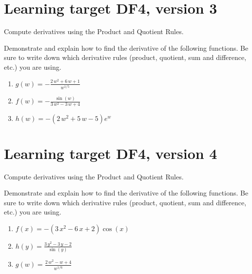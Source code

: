 \pagebreak

\section{Learning target DF4, version 3}

Compute derivatives using the Product and Quotient Rules.

\hrulefill

Demonstrate and explain how to find the derivative of the following functions. Be sure to write down which derivative rules (product, quotient, sum and difference, etc.) you are using.

\begin{enumerate}
    \item \(\renewcommand{\log}{\ln} g(w)= -\frac{2 \, w^{2} + 6 \, w + 1}{w^{1/5}}\)
    \vfill
    \item \(\renewcommand{\log}{\ln} f(w)= -\frac{\sin\left(w\right)}{3 \, w^{2} - 3 \, w + 4}\)
    \vfill
    \item \(\renewcommand{\log}{\ln} h(w)= -{\left(2 \, w^{2} + 5 \, w - 5\right)} e^{w}\)
    \vfill
\end{enumerate}

\pagebreak

\section{Learning target DF4, version 4}

Compute derivatives using the Product and Quotient Rules.

\hrulefill

Demonstrate and explain how to find the derivative of the following functions. Be sure to write down which derivative rules (product, quotient, sum and difference, etc.) you are using.

\begin{enumerate}
    \item \(\renewcommand{\log}{\ln} f(x)= -{\left(3 \, x^{2} - 6 \, x + 2\right)} \cos\left(x\right)\)
    \vfill
    \item \(\renewcommand{\log}{\ln} h(y)= \frac{3 \, y^{2} - 3 \, y - 2}{\sin\left(y\right)}\)
    \vfill
    \item \(\renewcommand{\log}{\ln} g(w)= \frac{2 \, w^{2} - w + 4}{w^{1/6}}\)
    \vfill
\end{enumerate}

\pagebreak


